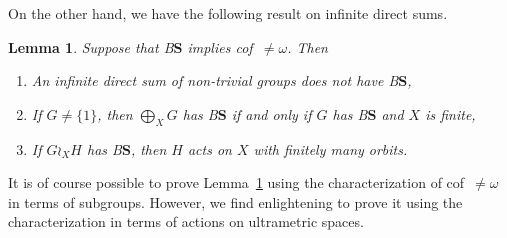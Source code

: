 \documentclass[a4paper]{article}
\newtheorem{lem}{Lemma}[section]
\theoremstyle{definition}
\newcommand*{\BS}{B$\mathbf{S}$}
\begin{document}
On the other hand, we have the following result on infinite direct sums.
%
%
\begin{lem}\label{Lemma:Cof}
Suppose that \BS{} implies cof~$\neq\omega$. Then
\begin{enumerate}
\item An infinite direct sum of non-trivial groups does not have \BS,
\item If $G\neq\{1\}$, then $\bigoplus_XG$ has \BS{} if and only if $G$ has \BS{} and $X$ is finite,
\item If $G\wr_XH$ has \BS, then $H$ acts on $X$ with finitely many orbits.
\end{enumerate}
\end{lem}
%
%
It is of course possible to prove Lemma~\ref{Lemma:Cof} using the characterization of cof~$\neq\omega$ in terms of subgroups. However, we find enlightening to prove it using the characterization in terms of actions on ultrametric spaces.
%
%
\end{document}
